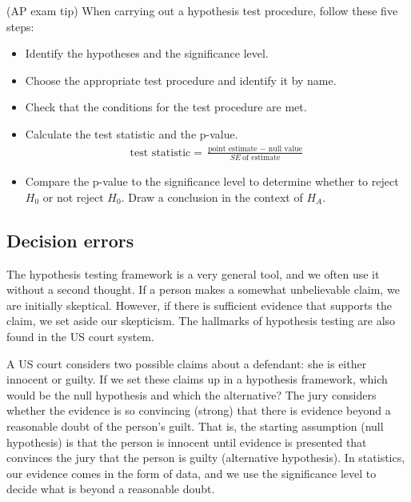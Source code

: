 \begin{onebox}{(AP exam tip) When carrying out a hypothesis test procedure, follow these five steps:}
\begin{itemize}
\setlength{\itemsep}{0mm}
\item {}  Identify the hypotheses and the significance level.
\item  {}  Choose the appropriate test procedure and identify it by name.
\item  {}  Check that the conditions for the test procedure are met. 
\item {} Calculate the test statistic and the p-value.  
\begin{align*}
\text{test statistic} = \frac{\text{point estimate } - \text{ null value}}{SE\ \text{of estimate}}
\end{align*}
\item {} Compare the p-value to the significance level to determine whether to reject $H_0$ or not reject $H_0$.  Draw a conclusion in the context of $H_A$.  
\end{itemize}\end{onebox}

\subsection{Decision errors}
The hypothesis testing framework is a very general tool, and we often use it without a second thought. If a person makes a somewhat unbelievable claim, we are initially skeptical. However, if there is sufficient evidence that supports the claim, we set aside our skepticism. The hallmarks of hypothesis testing are also found in the US court system. 

\begin{examplewrap}
\begin{nexample}{A US court considers two possible claims about a defendant: she is either innocent or guilty. If we set these claims up in a hypothesis framework, which would be the null hypothesis and which the alternative?}\label{hypTestCourtExample}
The jury considers whether the evidence is so convincing (strong) that there is evidence beyond a reasonable doubt of the person's guilt. That is, the starting assumption (null hypothesis) is that the person is innocent until evidence is presented that convinces the jury that the person is guilty (alternative hypothesis). In statistics, our evidence comes in the form of data, and we use the significance level to decide what is beyond a reasonable doubt.
\end{nexample}
\end{examplewrap}


